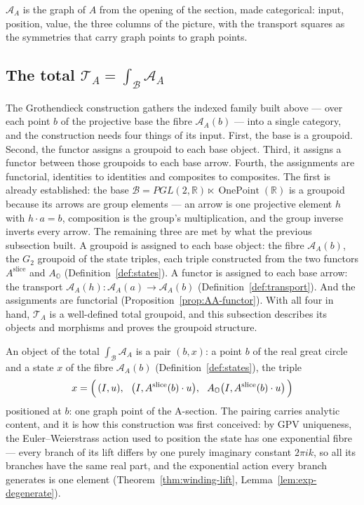 \documentclass[11pt]{article}
\newcommand{\OO}{\mathbb{O}}
\newcommand{\RR}{\mathbb{R}}
\theoremstyle{plain}
\theoremstyle{definition}
\theoremstyle{remark}
\begin{document}
$\mathcal A_A$ is the
graph of $A$ from the opening of the section, made categorical: input,
position, value, the three columns of the picture, with the transport squares
as the symmetries that carry graph points to graph points.

\subsection*{The total $\mathcal T_A=\int_{\mathcal B}\mathcal A_A$}

The Grothendieck construction gathers the indexed family built above ---
over each point $b$ of the projective base the fibre $\mathcal A_A(b)$ ---
into a single category, and the construction needs four things of its
input. First, the base is a groupoid. Second, the functor assigns a
groupoid to each base object. Third, it assigns a functor between those
groupoids to each base arrow. Fourth, the assignments are functorial,
identities to identities and composites to composites. The first is
already established: the base
$\mathcal B=PGL(2,\RR)\ltimes\operatorname{OnePoint}(\RR)$ is a groupoid
because its arrows are group elements --- an arrow is one projective
element $h$ with $h\cdot a=b$, composition is the
group's multiplication, and the group inverse inverts every arrow. The remaining three are met by what the previous subsection built. A
groupoid is assigned to each base object: the fibre $\mathcal A_A(b)$, the
$G_2$ groupoid of the state triples, each triple constructed from the two
functors $A^{\mathrm{slice}}$ and $A_{\OO}$
(Definition~\ref{def:states}). A functor is assigned to each base arrow: the
transport $\mathcal A_A(h):\mathcal A_A(a)\to\mathcal A_A(b)$
(Definition~\ref{def:transport}). And the assignments are functorial
(Proposition~\ref{prop:AA-functor}). With all four in hand,
$\mathcal T_A$ is a well-defined total groupoid, and this subsection
describes its objects and morphisms and proves the groupoid structure.

An object of the total $\int_{\mathcal B}\mathcal A_A$ is a pair
$(b,x)$: a point $b$ of the real great circle and a state $x$ of the
fibre $\mathcal A_A(b)$ (Definition~\ref{def:states}), the triple
\[
  x=\Bigl(\,(I,u),\ \
  \bigl(I,A^{\mathrm{slice}}(b)\cdot u\bigr),\ \
  A_{\OO}\bigl(I,A^{\mathrm{slice}}(b)\cdot u\bigr)\,\Bigr)
\]
positioned at $b$: one graph point of the A-section. The pairing
carries analytic content, and it is how this construction was first
conceived: by GPV uniqueness, the Euler--Weierstrass action used to position
the state has one exponential fibre --- every branch of its lift differs by
one purely imaginary constant $2\pi ik$, so all its branches have the same
real part, and the exponential action every branch generates is one element
(Theorem~\ref{thm:winding-lift}, Lemma~\ref{lem:exp-degenerate}).
\end{document}
